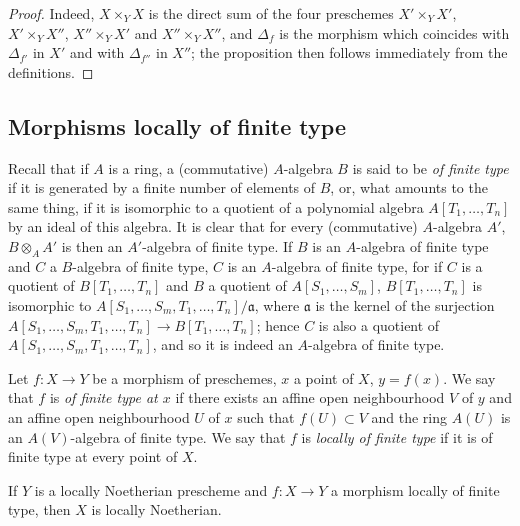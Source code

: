 \begin{proof}
Indeed, $X\times_Y X$ is the direct sum of the four preschemes $X'\times_Y X'$, $X'\times_Y X''$, $X''\times_Y X'$
and $X''\times_Y X''$, and $\Delta_f$ is the morphism which coincides with $\Delta_{f'}$ in $X'$ and with $\Delta_{f''}$ in $X''$;
the proposition then follows immediately from the definitions.
\end{proof}

\subsection{Morphisms locally of finite type}
\label{subsection:IV.1.3}

\begin{env}[1.3.1]
\label{IV.1.3.1}
Recall that if $A$ is a ring, a (commutative) $A$-algebra $B$ is
said to be \emph{of finite type} if it is generated by a finite number of elements of $B$, or, what amounts to
the same thing, if it is isomorphic to a quotient of a polynomial algebra $A[T_1,\ldots,T_n]$
by an ideal of this algebra. It is clear that for every (commutative) $A$-algebra $A'$,
$B\otimes_A A'$ is then an $A'$-algebra of finite type. If $B$ is an $A$-algebra of finite type and $C$
a $B$-algebra of finite type, $C$ is an $A$-algebra of finite type, for if $C$ is a quotient
of $B[T_1,\ldots,T_n]$ and $B$ a quotient of $A[S_1,\ldots,S_m]$, $B[T_1,\ldots,T_n]$ is isomorphic to $A[S_1,\ldots,S_m,T_1,\ldots,T_n]/\mathfrak{a}$,
where $\mathfrak{a}$ is the kernel of the surjection $A[S_1,\ldots,S_m,T_1,\ldots,T_n]\to B[T_1,\ldots,T_n]$; hence $C$ is also a quotient of
$A[S_1,\ldots,S_m,T_1,\ldots,T_n]$, and so it is indeed an $A$-algebra of finite type.
\end{env}

\begin{definition}[1.3.2]
\label{IV.1.3.2}
Let $f:X\to Y$ be a morphism of preschemes, $x$ a point of $X$,
$y=f(x)$. We say that $f$ is \emph{of finite type at $x$} if there exists an affine open neighbourhood $V$ of $y$ and an affine open
neighbourhood $U$ of $x$ such that $f(U)\subset V$ and the ring $A(U)$ is an $A(V)$-algebra of finite type.
We say that $f$ is \emph{locally of finite type} if it is of finite type at every point of $X$.
\end{definition}


\begin{proposition}[1.3.3]
\label{IV.1.3.3}
If $Y$ is a locally Noetherian prescheme and $f:X\to Y$ a
morphism locally of finite type, then $X$ is locally Noetherian.
\end{proposition}

